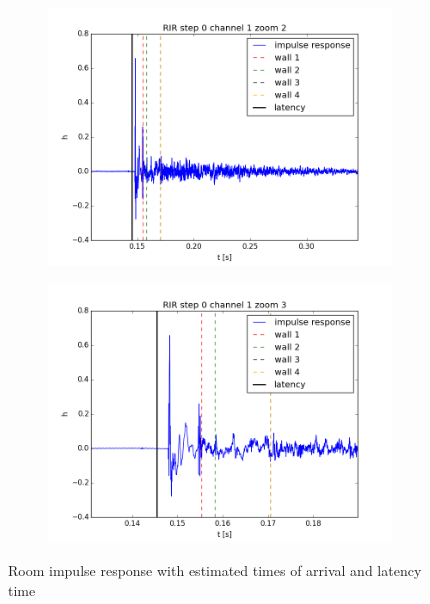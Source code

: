 \begin{figure}[htb]
	\centering		
	\begin{subfigure}[b]{0.49\linewidth}
        \centering
		\includegraphics[width=\linewidth]{files/0_1_RIR_zoom2.png}
	\end{subfigure} 
	\begin{subfigure}[b]{0.49\linewidth}
        \centering
		\includegraphics[width=\linewidth]{files/0_1_RIR_zoom3.png}
	\end{subfigure}
	\caption{Room impulse response with estimated times of arrival and latency time} 
	\label{fig:RIR_zooms}
\end{figure}

